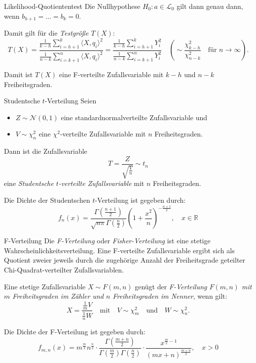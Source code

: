 \begin{defi}{Likelihood-Quotiententest}
    Die Nullhypothese $H_0: a \in \mathcal{L}_0$ gilt dann genau dann, wenn $b_{h + 1} = \ldots = b_k = 0$.

    Damit gilt für die \emph{Testgröße $T(X)$}:
    \[
        T(X) = \frac{\frac{1}{k - h} \sum_{i = h + 1}^{k} \langle X, q_i \rangle^2}{\frac{1}{n - k} \sum_{i = k + 1}^{n} \langle X, q_i \rangle^2} = \frac{\frac{1}{k - h} \sum_{i = h + 1}^{k} Y_i^2}{\frac{1}{n - k} \sum_{i = k + 1}^{n} Y_i^2} \quad \left( \sim \frac{\chi^2_{k - h}}{\chi^2_{n - k}} \quad \text{für } n \to \infty \right).
    \]

    Damit ist $T(X)$ eine F-verteilte Zufallsvariable mit $k - h$ und $n - k$ Freiheitsgraden.
\end{defi}

\begin{defi}{Studentsche $t$-Verteilung}
    Seien
    \begin{itemize}
        \item $Z \sim \mathcal{N}(0, 1)$ eine standardnormalverteilte Zufallsvariable und
        \item $V \sim \chi^2_n$ eine $\chi^2$-verteilte Zufallsvariable mit $n$ Freiheitsgraden.
    \end{itemize}

    Dann ist die Zufallsvariable
    \[
        T = \frac{Z}{\sqrt{\frac{V}{n}}} \sim t_n
    \]
    eine \emph{Studentsche $t$-verteilte Zufallsvariable} mit $n$ Freiheitsgraden.

    Die Dichte der Studentschen $t$-Verteilung ist gegeben durch:
    \[
        f_n(x) = \frac{ \Gamma \left( \frac{n+1}{2} \right) }{\sqrt{n \pi} \Gamma \left( \frac{n}{2} \right) } \left( 1 + \frac{x^2}{n} \right)^{- \frac{n+1}{2}}, \quad x \in \mathbb{R}
    \]
\end{defi}

\begin{defi}{F-Verteilung}
    Die \emph{F-Verteilung} oder \emph{Fisher-Verteilung}  ist eine stetige Wahrscheinlichkeitsverteilung.
    Eine F-verteilte Zufallsvariable ergibt sich als Quotient zweier jeweils durch die zugehörige Anzahl der Freiheitsgrade geteilter Chi-Quadrat-verteilter Zufallsvariablen.

    Eine stetige Zufallsvariable $X \sim F(m, n)$ genügt der \emph{F-Verteilung $F(m, n)$ mit $m$ Freiheitsgraden im Zähler und $n$ Freiheitsgraden im Nenner}, wenn gilt:
    \[
        X = \frac{\frac{1}{m} V}{\frac{1}{n} W} \quad \text{mit} \quad V \sim \chi^2_m \quad \text{und} \quad W \sim \chi^2_n.
    \]

    Die Dichte der F-Verteilung ist gegeben durch:
    \[
        f_{m, n}(x) = m^{\frac {m}{2}}n^{\frac {n}{2}}\cdot {\frac {\Gamma ({\frac {m+n}{2}})}{\Gamma ({\frac {m}{2}})\Gamma ({\frac {n}{2}})}}\cdot {\frac {x^{{\frac {m}{2}}-1}}{(mx+n)^{\frac {m+n}{2}}}}, \quad x>0
    \]
\end{defi}

